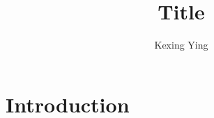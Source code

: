\documentclass[]{article}
\title{Title}
\author{Kexing Ying}
\theoremstyle{definition}
\begin{document}
\maketitle

\section*{Introduction}
\end{document}
